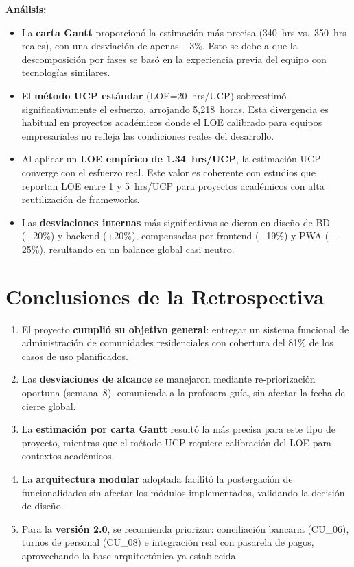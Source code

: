 \textbf{Análisis:}
\begin{itemize}
    \item La \textbf{carta Gantt} proporcionó la estimación más precisa (340~hrs vs.\ 350~hrs reales), con una desviación de apenas $-$3\%. Esto se debe a que la descomposición por fases se basó en la experiencia previa del equipo con tecnologías similares.

    \item El \textbf{método UCP estándar} (LOE=20~hrs/UCP) sobreestimó significativamente el esfuerzo, arrojando 5{,}218~horas. Esta divergencia es habitual en proyectos académicos donde el LOE calibrado para equipos empresariales no refleja las condiciones reales del desarrollo.

    \item Al aplicar un \textbf{LOE empírico de 1.34~hrs/UCP}, la estimación UCP converge con el esfuerzo real. Este valor es coherente con estudios que reportan LOE entre 1 y 5~hrs/UCP para proyectos académicos con alta reutilización de frameworks.

    \item Las \textbf{desviaciones internas} más significativas se dieron en diseño de BD (+20\%) y backend (+20\%), compensadas por frontend ($-$19\%) y PWA ($-$25\%), resultando en un balance global casi neutro.
\end{itemize}

\section{Conclusiones de la Retrospectiva}

\begin{enumerate}
    \item El proyecto \textbf{cumplió su objetivo general}: entregar un sistema funcional de administración de comunidades residenciales con cobertura del 81\% de los casos de uso planificados.

    \item Las \textbf{desviaciones de alcance} se manejaron mediante re-priorización oportuna (semana~8), comunicada a la profesora guía, sin afectar la fecha de cierre global.

    \item La \textbf{estimación por carta Gantt} resultó la más precisa para este tipo de proyecto, mientras que el método UCP requiere calibración del LOE para contextos académicos.

    \item La \textbf{arquitectura modular} adoptada facilitó la postergación de funcionalidades sin afectar los módulos implementados, validando la decisión de diseño.

    \item Para la \textbf{versión 2.0}, se recomienda priorizar: conciliación bancaria (CU\_06), turnos de personal (CU\_08) e integración real con pasarela de pagos, aprovechando la base arquitectónica ya establecida.
\end{enumerate}